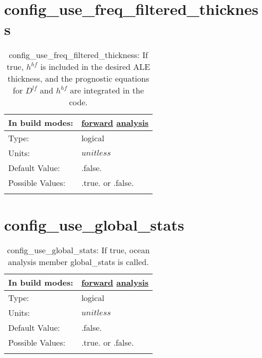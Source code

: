 \section[config\_use\_freq\_filtered\_thickness]{config\_use\_freq\_filtered\_thickness}
\label{sec:nm_sec_config_use_freq_filtered_thickness}
\begin{center}
\begin{longtable}{| p{2.0in} || p{4.0in} |}
    \hline
    In build modes: & \hyperref[subsec:forward_nm_tab_ALE_frequency_filtered_thickness]{forward} \hyperref[subsec:analysis_nm_tab_ALE_frequency_filtered_thickness]{analysis} \\
    \hline
    Type: & logical \\
    \hline
    Units: & $unitless$ \\
    \hline
    Default Value: & .false. \\
    \hline
    Possible Values: & .true. or .false. \\
    \hline
    \caption{config\_use\_freq\_filtered\_thickness:  If true,  $h^{hf}$  is included in the desired ALE thickness, and the prognostic equations for  $D^{lf}$  and  $h^{hf}$  are integrated in the code.}
\end{longtable}
\end{center}
\section[config\_use\_global\_stats]{config\_use\_global\_stats}
\label{sec:nm_sec_config_use_global_stats}
\begin{center}
\begin{longtable}{| p{2.0in} || p{4.0in} |}
    \hline
    In build modes: & \hyperref[subsec:forward_nm_tab_global_stats]{forward} \hyperref[subsec:analysis_nm_tab_global_stats]{analysis} \\
    \hline
    Type: & logical \\
    \hline
    Units: & $unitless$ \\
    \hline
    Default Value: & .false. \\
    \hline
    Possible Values: & .true. or .false. \\
    \hline
    \caption{config\_use\_global\_stats: If true, ocean analysis member global\_stats is called.}
\end{longtable}
\end{center}
